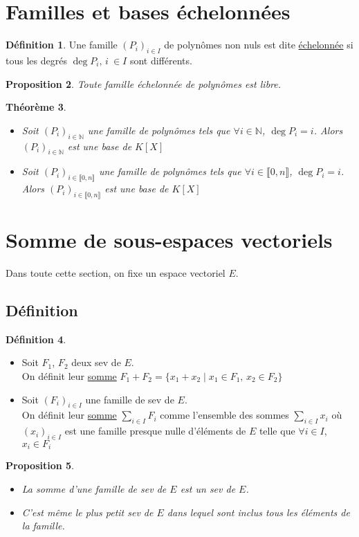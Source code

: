 \documentclass[10pt,a4paper]{article}
\theoremstyle{plain}
\newtheorem{proposition}{Proposition}[section]
\newtheorem{theorem}[proposition]{Théorème}
\theoremstyle{definition}
\newtheorem{definition}[proposition]{Définition}
\begin{document}
\section{Familles et bases échelonnées}
\begin{definition}
Une famille $(P_i)_{i \in I}$ de polynômes non nuls est dite \uline{échelonnée} si tous les degrés $\deg P_i,\, i\ \in I$ sont différents.
\end{definition}
\begin{proposition}
Toute famille échelonnée de polynômes est libre.
\end{proposition}
\begin{theorem}
\hfill
\begin{itemize}
\item Soit $(P_i)_{i \in \mathbb{N}}$ une famille de polynômes tels que $\forall i \in \mathbb{N}$, $\deg P_i = i$. Alors $(P_i)_{i \in \mathbb{N}}$ est une base de $K[X]$
\item Soit $(P_i)_{i \in \llbracket 0, n \rrbracket}$ une famille de polynômes tels que $\forall i \in \llbracket 0, n \rrbracket$, $\deg P_i = i$. Alors $(P_i)_{i \in \llbracket 0, n \rrbracket}$ est une base de $K[X]$
\end{itemize}
\end{theorem}

\pagebreak

\section{Somme de sous-espaces vectoriels}
Dans toute cette section, on fixe un espace vectoriel $E$.
\subsection{Définition}
\begin{definition}
\hfill
\begin{itemize}
\item Soit $F_1$, $F_2$ deux sev de $E$. \\
On définit leur \uline{somme} $F_1 + F_2 = \{ x_1 + x_2 \mid x_1 \in F_1,\, x_2 \in F_2 \}$
\item Soit $(F_i)_{i \in I}$ une famille de sev de $E$. \\
On définit leur \uline{somme} $\sum\limits_{i \in I} F_i$ comme l'ensemble des sommes $\sum\limits_{i \in I} x_i$ où $(x_i)_{i \in I}$ est une famille presque nulle d'éléments de $E$ telle que $\forall i \in I$, $x_i \in F_i$
\end{itemize}
\end{definition}
\begin{proposition}
\hfill
\begin{itemize}
\item La somme d'une famille de sev de $E$ est un sev de $E$.
\item C'est même le plus petit sev de $E$ dans lequel sont inclus tous les éléments de la famille.
\end{itemize}
\end{proposition}
\end{document}
